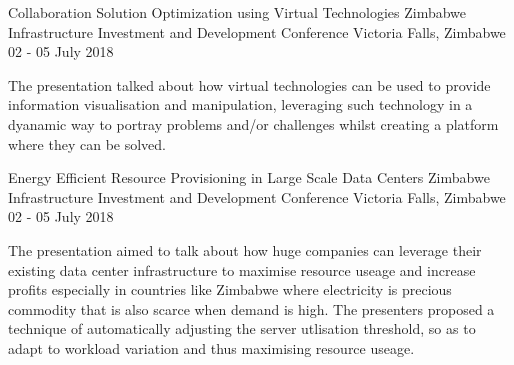 

\begin{cventries}

  \cventry
    {Collaboration Solution Optimization using Virtual Technologies} %
    {Zimbabwe Infrastructure Investment and Development Conference} %
    {Victoria Falls, Zimbabwe} %
    {02 - 05 July 2018} %
    {
      \begin{cvitems} %
        \item {The presentation talked about how virtual technologies can be used to provide information visualisation and manipulation, leveraging such technology in a dyanamic way to portray problems and/or challenges whilst creating a platform where they can be solved.}
      \end{cvitems}
    }

  \cventry
    {Energy Efficient Resource Provisioning in Large Scale Data Centers} %
    {Zimbabwe Infrastructure Investment and Development Conference} %
    {Victoria Falls, Zimbabwe} %
    {02 - 05 July 2018} %
    {
      \begin{cvitems} %
        \item {The presentation aimed to talk about how huge companies can leverage their existing data center infrastructure to maximise resource useage and increase profits especially in countries like Zimbabwe where electricity is precious commodity that is also scarce when demand is high. The presenters proposed  a technique of automatically adjusting the server utlisation threshold, so as to adapt to workload variation and thus maximising resource useage.}
      \end{cvitems}
    }

\end{cventries}
